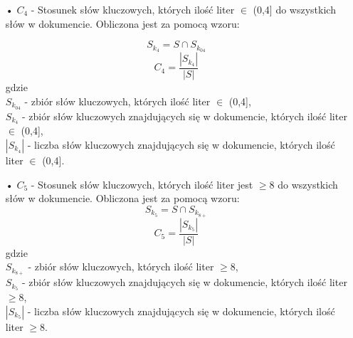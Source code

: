 \documentclass{classrep}
\begin{document}
\begin{itemize}
\item[•] $C_4$ - Stosunek słów kluczowych, których ilość liter $\in$ (0,4] do wszystkich słów w dokumencie. Obliczona jest za pomocą wzoru:

\begin{equation} S_{k_{4}} = S \cap S_{k_{04}}  \end{equation}
\begin{equation} C_4 = \frac{|S_{k_{4}}|}{|S|}  \end{equation} gdzie \\
$S_{k_{04}}$ - zbiór słów kluczowych, których ilość liter $\in$ (0,4], \\
$S_{k_{4}}$ - zbiór słów kluczowych znajdujących się w dokumencie, których ilość liter $\in$ (0,4], \\
$|S_{k_{4}}|$ - liczba słów kluczowych znajdujących się w dokumencie, których ilość liter $\in$ (0,4]. \\

\item[•] $C_5$ - Stosunek słów kluczowych, których ilość liter jest $\geq$8 do wszystkich słów w dokumencie. Obliczona jest za pomocą wzoru:
\begin{equation} S_{k_{5}} = S \cap S_{k_{8+}}  \end{equation}
\begin{equation} C_5 = \frac{|S_{k_{5}}|}{|S|}  \end{equation} gdzie \\
$S_{k_{8+}}$ - zbiór słów kluczowych, których ilość liter $\geq$8, \\
$S_{k_{5}}$ - zbiór słów kluczowych znajdujących się w dokumencie, których ilość liter $\geq$8, \\
$|S_{k_{5}}|$ - liczba słów kluczowych znajdujących się w dokumencie, których ilość liter $\geq$8. \\


\end{itemize}
\end{document}
